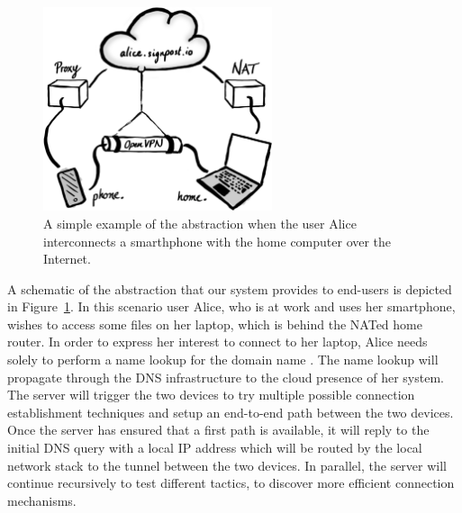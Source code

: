 \begin{figure}[ht]
  \begin{center}
	\includegraphics[width=0.6\textwidth]{signpost-illustration}
  \end{center}
  \caption{A simple example of the \signpost abstraction when the user Alice
    interconnects a smarthphone with the home computer over the Internet.}
  \label{fig:signpost-user-abstraction}
\end{figure}
A schematic of the abstraction that our system provides to end-users is depicted
in Figure~\ref{fig:signpost-user-abstraction}. In this scenario user Alice, who
is at work and uses her smartphone, wishes to access some files on her laptop,
which is behind the NATed home router. In order to express her interest to
connect to her laptop, Alice needs solely to perform a name lookup for the
domain name . The name lookup will propagate through the
DNS infrastructure to the cloud presence of her \signpost system. The \signpost
server will trigger the two devices to try multiple possible connection
establishment techniques and
setup an end-to-end path between the two devices. Once the server has
ensured that a first path is available, it will reply to the initial
DNS query with a local IP address which will be routed by the local network
stack to the tunnel between the two devices. In parallel, the server will
continue recursively to test different tactics, to discover more efficient
connection mechanisms. 


